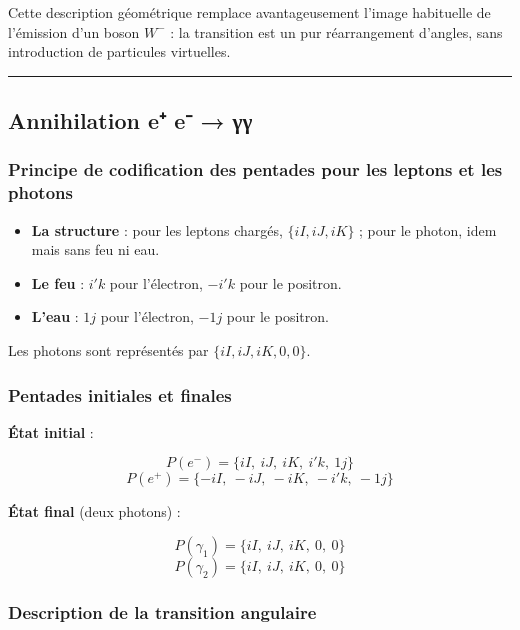\documentclass[11pt]{article}
\providecommand{\tightlist}{%
\setlength{\itemsep}{2pt}\setlength{\parskip}{6pt}
}
\begin{document}
Cette description géométrique remplace avantageusement l'image
habituelle de l'émission d'un boson \(W^-\) : la transition est un pur
réarrangement d'angles, sans introduction de particules virtuelles.

\begin{center}\rule{0.5\linewidth}{0.5pt}\end{center}

\hypertarget{annihilation-e-e-ux3b3ux3b3}{%
\subsection{Annihilation e⁺ e⁻ → γγ}\label{annihilation-e-e-ux3b3ux3b3}}

\hypertarget{principe-de-codification-des-pentades-pour-les-leptons-et-les-photons}{%
\subsubsection{Principe de codification des pentades pour les leptons et
les
photons}\label{principe-de-codification-des-pentades-pour-les-leptons-et-les-photons}}

\begin{itemize}
\tightlist
\item
  \textbf{La structure} : pour les leptons chargés, \(\{iI, iJ, iK\}\) ;
  pour le photon, idem mais sans feu ni eau.
\item
  \textbf{Le feu} : \(i'k\) pour l'électron, \(-i'k\) pour le positron.
\item
  \textbf{L'eau} : \(1j\) pour l'électron, \(-1j\) pour le positron.
\end{itemize}

Les photons sont représentés par \(\{iI, iJ, iK, 0, 0\}\).

\hypertarget{pentades-initiales-et-finales}{%
\subsubsection{Pentades initiales et
finales}\label{pentades-initiales-et-finales}}

\textbf{État initial} :

\[
P(e^-) = \{ iI,\ iJ,\ iK,\ i'k,\ 1j \}
\] \[
P(e^+) = \{ -iI,\ -iJ,\ -iK,\ -i'k,\ -1j \}
\]

\textbf{État final} (deux photons) :

\[
P(\gamma_1) = \{ iI,\ iJ,\ iK,\ 0,\ 0 \}
\] \[
P(\gamma_2) = \{ iI,\ iJ,\ iK,\ 0,\ 0 \}
\]

\hypertarget{description-de-la-transition-angulaire-1}{%
\subsubsection{Description de la transition
angulaire}\label{description-de-la-transition-angulaire-1}}
\end{document}
